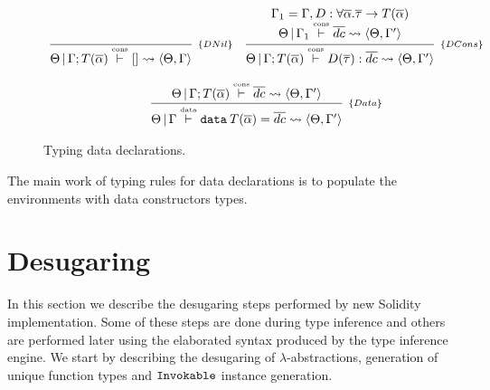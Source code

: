 \documentclass[a4paper, 11pt]{article}
\theoremstyle{definition}
\begin{document}
\begin{figure}[H]
  \[
    \begin{array}{cc}
      \infer[_{\{DNil\}}]
            {\Theta\,|\,\Gamma ; T(\overline{\alpha})\typing{cons} [] \leadsto \langle \Theta, \Gamma \rangle}
            {}
      &
      \infer[_{\{DCons\}}]
            {\Theta\,|\,\Gamma ; T(\overline{\alpha}) \typing{cons} D(\overline{\tau}) : \overline{dc}\leadsto \langle \Theta, \Gamma' \rangle }
            {\begin{array}{c}
              \Gamma_1 = \Gamma, D : \forall \overline{\alpha} . \overline{\tau} \to T(\overline{\alpha})\\
              \Theta\,|\,\Gamma_1 \typing{cons} \overline{dc} \leadsto \langle \Theta, \Gamma' \rangle  
             \end{array}}
      \\ \\
      \multicolumn{2}{c}{
        \infer[_{\{Data\}}]
              {\Theta\,|\,\Gamma \typing{data} \mathtt{data}\:T(\overline{\alpha}) = \overline{dc} \leadsto \langle \Theta, \Gamma' \rangle}
              {\Theta\,|\,\Gamma ; T(\overline{\alpha})\typing{cons} \overline{dc} \leadsto \langle \Theta, \Gamma' \rangle}
      }
    \end{array}
  \]
  \centering
  \caption{Typing data declarations.}
  \label{fig:datatyping}
\end{figure}

The main work of typing rules for data declarations is to populate the 
environments with data constructors types.


\section{Desugaring}\label{sec:desugar} 

In this section we describe the desugaring steps performed by new 
Solidity implementation. Some of these steps are done during type inference 
and others are performed later using the elaborated syntax produced by 
the type inference engine. We start by describing the desugaring 
of $\lambda$-abstractions, generation of unique function types and 
$\mathtt{Invokable}$ instance generation.
\end{document}

